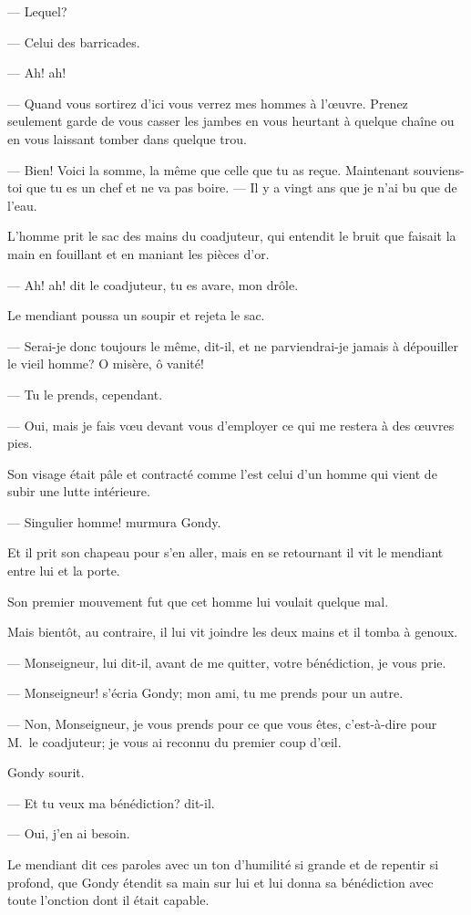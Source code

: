 — Lequel?

— Celui des barricades.

— Ah! ah!

— Quand vous sortirez d'ici vous verrez mes hommes à l'œuvre. Prenez seulement garde de vous casser les jambes en vous heurtant à quelque chaîne ou en vous laissant tomber dans quelque trou.

— Bien! Voici la somme, la même que celle que tu as reçue. Maintenant souviens-toi que tu es un chef et ne va pas boire.
— Il y a vingt ans que je n'ai bu que de l'eau.

L'homme prit le sac des mains du coadjuteur, qui entendit le bruit que faisait la main en fouillant et en maniant les pièces d'or.

— Ah! ah! dit le coadjuteur, tu es avare, mon drôle.

Le mendiant poussa un soupir et rejeta le sac.

— Serai-je donc toujours le même, dit-il, et ne parviendrai-je jamais à dépouiller le vieil homme? O misère, ô vanité!

— Tu le prends, cependant.

— Oui, mais je fais vœu devant vous d'employer ce qui me restera à des œuvres pies.

Son visage était pâle et contracté comme l'est celui d'un homme qui vient de subir une lutte intérieure.

— Singulier homme! murmura Gondy.

Et il prit son chapeau pour s'en aller, mais en se retournant il vit le mendiant entre lui et la porte.

Son premier mouvement fut que cet homme lui voulait quelque mal.

Mais bientôt, au contraire, il lui vit joindre les deux mains et il tomba à genoux.

— Monseigneur, lui dit-il, avant de me quitter, votre bénédiction, je vous prie.

— Monseigneur! s'écria Gondy; mon ami, tu me prends pour un autre.

— Non, Monseigneur, je vous prends pour ce que vous êtes, c'est-à-dire pour M.~le coadjuteur; je vous ai reconnu du premier coup d'œil.

Gondy sourit.

— Et tu veux ma bénédiction? dit-il.

— Oui, j'en ai besoin.

Le mendiant dit ces paroles avec un ton d'humilité si grande et de repentir si profond, que Gondy étendit sa main sur lui et lui donna sa bénédiction avec toute l'onction dont il était capable.

